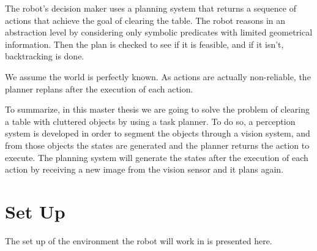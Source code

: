 The robot's decision maker uses a planning system that returns a sequence of actions that achieve the goal of clearing the table. 
The robot reasons in an abstraction level by considering only symbolic predicates with limited geometrical information. Then the plan is checked to see if it is feasible, and if it isn't, backtracking is done.

We assume the world is perfectly known. As actions are actually non-reliable, the planner replans after the execution of each action.  

To summarize, in this master thesis we are going to solve the problem of clearing a table with cluttered objects by using a task planner. To do so, a perception system is developed in order to segment the objects through a vision system, and from those objects the states are generated and the planner returns the action to execute. The planning system will generate the states after the execution of each action by receiving a new image from the vision sensor and it plans again.

\section{Set Up}
The set up of the environment the robot will work in is presented here. 

